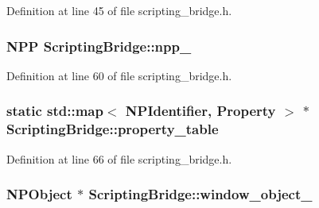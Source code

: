 Definition at line 45 of file scripting\_\-bridge.h.

\hypertarget{classbridge_1_1_scripting_bridge_a122d088702ccb290a91a0cb1c507fbbe}{
\subsubsection[{npp\_\-}]{\setlength{\rightskip}{0pt plus 5cm}NPP {\bf ScriptingBridge::npp\_\-}}}
\label{classbridge_1_1_scripting_bridge_a122d088702ccb290a91a0cb1c507fbbe}


Definition at line 60 of file scripting\_\-bridge.h.

\hypertarget{classbridge_1_1_scripting_bridge_a84c8336a6ba799945dfe31358d389a62}{
\subsubsection[{property\_\-table}]{\setlength{\rightskip}{0pt plus 5cm}static std::map$<$ NPIdentifier, {\bf Property} $>$ $\ast$ {\bf ScriptingBridge::property\_\-table}}}
\label{classbridge_1_1_scripting_bridge_a84c8336a6ba799945dfe31358d389a62}


Definition at line 66 of file scripting\_\-bridge.h.

\hypertarget{classbridge_1_1_scripting_bridge_a59bc10d2500b138998dc973aee38039e}{
\subsubsection[{window\_\-object\_\-}]{\setlength{\rightskip}{0pt plus 5cm}NPObject $\ast$ {\bf ScriptingBridge::window\_\-object\_\-}}}
\label{classbridge_1_1_scripting_bridge_a59bc10d2500b138998dc973aee38039e}


